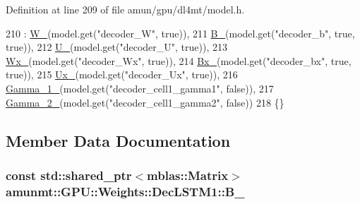 Definition at line 209 of file amun/gpu/dl4mt/model.\+h.


\begin{DoxyCode}
210     : \hyperlink{structamunmt_1_1GPU_1_1Weights_1_1DecLSTM1_a14ad4a0efd22919d5e5fd67f95e0014a}{W\_}(model.get(\textcolor{stringliteral}{"decoder\_W"}, \textcolor{keyword}{true})),
211       \hyperlink{structamunmt_1_1GPU_1_1Weights_1_1DecLSTM1_a02a26fbf948a7565a09c1fc515ccdf90}{B\_}(model.get(\textcolor{stringliteral}{"decoder\_b"}, \textcolor{keyword}{true}, \textcolor{keyword}{true})),
212       \hyperlink{structamunmt_1_1GPU_1_1Weights_1_1DecLSTM1_adbc5681037f5ea847bccb8bb4acf2912}{U\_}(model.get(\textcolor{stringliteral}{"decoder\_U"}, \textcolor{keyword}{true})),
213       \hyperlink{structamunmt_1_1GPU_1_1Weights_1_1DecLSTM1_a0e3e607b5895d2344f03965abba9a1b9}{Wx\_}(model.get(\textcolor{stringliteral}{"decoder\_Wx"}, \textcolor{keyword}{true})),
214       \hyperlink{structamunmt_1_1GPU_1_1Weights_1_1DecLSTM1_a1b3722163a279f235e46795762d8c6a1}{Bx\_}(model.get(\textcolor{stringliteral}{"decoder\_bx"}, \textcolor{keyword}{true}, \textcolor{keyword}{true})),
215       \hyperlink{structamunmt_1_1GPU_1_1Weights_1_1DecLSTM1_abc72690d65a7ed0dbd8d9a36027a40ce}{Ux\_}(model.get(\textcolor{stringliteral}{"decoder\_Ux"}, \textcolor{keyword}{true})),
216       \hyperlink{structamunmt_1_1GPU_1_1Weights_1_1DecLSTM1_afd4e493898528c6048cab37f2a74e7d9}{Gamma\_1\_}(model.get(\textcolor{stringliteral}{"decoder\_cell1\_gamma1"}, \textcolor{keyword}{false})),
217       \hyperlink{structamunmt_1_1GPU_1_1Weights_1_1DecLSTM1_a6fadb1d7a99e6d7d5d311ee88c6a3825}{Gamma\_2\_}(model.get(\textcolor{stringliteral}{"decoder\_cell1\_gamma2"}, \textcolor{keyword}{false}))
218     \{\}
\end{DoxyCode}


\subsection{Member Data Documentation}
\subsubsection[{\texorpdfstring{B\+\_\+}{B_}}]{\setlength{\rightskip}{0pt plus 5cm}const std\+::shared\+\_\+ptr$<${\bf mblas\+::\+Matrix}$>$ amunmt\+::\+G\+P\+U\+::\+Weights\+::\+Dec\+L\+S\+T\+M1\+::\+B\+\_\+}\hypertarget{structamunmt_1_1GPU_1_1Weights_1_1DecLSTM1_a02a26fbf948a7565a09c1fc515ccdf90}{}\label{structamunmt_1_1GPU_1_1Weights_1_1DecLSTM1_a02a26fbf948a7565a09c1fc515ccdf90}


